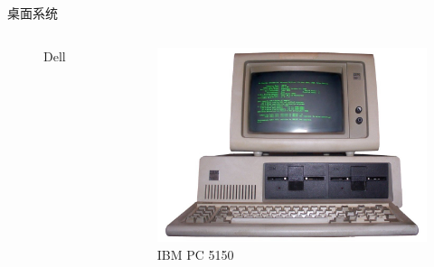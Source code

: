 \documentclass[UTF8]{ctexbeamer}
\begin{document}
\begin{frame}{桌面系统}
\begin{columns}
\begin{figure}
            \caption{Dell}
            \label{fig:dell}
        \end{figure}
        \begin{figure}
            \centering
            \includegraphics[width=\textwidth]{ibm-pc-5150.png}
            \caption{IBM PC 5150}
            \label{fig:ibmpc}
        \end{figure}
    \end{columns}
\end{frame}
\end{document}
